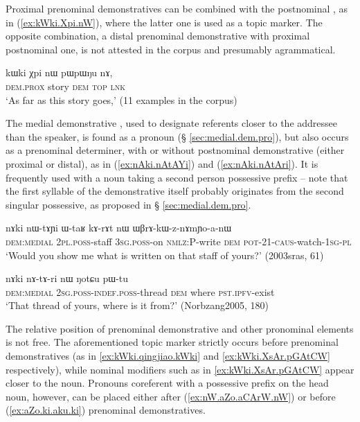 Proximal prenominal demonstratives can be combined with the postnominal , as in (\ref{ex:kWki.Xpi.nW}), where the latter one is used as a topic marker. The opposite combination, a distal prenominal demonstrative with proximal postnominal one, is not attested in the corpus and presumably agrammatical.

\begin{exe}
\ex \label{ex:kWki.Xpi.nW}
 \gll kɯki χpi nɯ pɯpɯŋu nɤ,  \\
 \textsc{dem}.\textsc{prox} story \textsc{dem} \textsc{top} \textsc{lnk} \\
 \glt `As far as this story goes,' (11 examples in the corpus)
\end{exe}

The medial demonstrative , used to designate referents closer to the addressee than the speaker, is found as a pronoun (§ \ref{sec:medial.dem.pro}), but also occurs as a prenominal determiner, with or without postnominal demonstrative (either proximal or distal), as in (\ref{ex:nAki.nAtAYi}) and (\ref{ex:nAki.nAtAri}). It is frequently used with a noun taking a second person possessive prefix -- note that the first syllable  of the demonstrative  itself probably originates from the second singular possessive, as proposed in § \ref{sec:medial.dem.pro}.

\begin{exe}
\ex \label{ex:nAki.nAtAYi}
 \gll nɤki nɯ-tɤɲi ɯ-taʁ kɤ-rɤt nɯ ɯβrɤ-kɯ-z-nɤmɲo-a-nɯ \\
 \textsc{dem}:\textsc{medial} \textsc{2pl}.\textsc{poss}-staff \textsc{3sg}.\textsc{poss}-on \textsc{nmlz}:P-write \textsc{dem} \textsc{pot}-2\fl{}1-\textsc{caus}-watch-\textsc{1sg}-\textsc{pl} \\
 \glt `Would you show me what is written on that staff of yours?' (2003sras, 61)
\end{exe}

\begin{exe}
\ex \label{ex:nAki.nAtAri}
 \gll nɤki nɤ-tɤ-ri nɯ ŋotɕu pɯ-tu \\
 \textsc{dem}:\textsc{medial} \textsc{2sg}.\textsc{poss}-\textsc{indef}.\textsc{poss}-thread \textsc{dem} where \textsc{pst}.\textsc{ipfv}-exist \\
\glt `That thread of yours, where is it from?' (Norbzang2005, 180)
\end{exe}

The relative position of prenominal demonstrative and other pronominal elements is not free. The aforementioned topic marker  strictly occurs before prenominal demonstratives (as in \ref{ex:kWki.qingjiao.kWki} and \ref{ex:kWki.XsAr.pGAtCW} respectively), while nominal modifiers such as  in \ref{ex:kWki.XsAr.pGAtCW} appear closer to the noun. Pronouns coreferent with a possessive prefix on the head noun, however, can be placed either after (\ref{ex:nW.aZo.aCArW.nW}) or before (\ref{ex:aZo.ki.aku.ki}) prenominal demonstratives.

